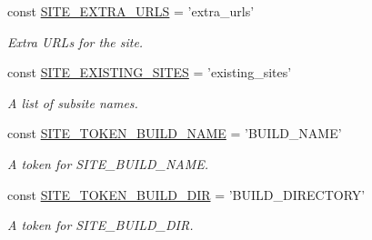 \begin{DoxyCompactItemize}
const \hyperlink{group__site__settings_ga7f80e281910ee7b5584e663f7bb3c27d}{S\-I\-T\-E\-\_\-\-E\-X\-T\-R\-A\-\_\-\-U\-R\-L\-S} = 'extra\-\_\-urls'
\begin{DoxyCompactList}\small\item\em Extra U\-R\-Ls for the site. \end{DoxyCompactList}\item 
const \hyperlink{group__site__settings_ga2ac1a89adfab61fc94edd6f4df134537}{S\-I\-T\-E\-\_\-\-E\-X\-I\-S\-T\-I\-N\-G\-\_\-\-S\-I\-T\-E\-S} = 'existing\-\_\-sites'
\begin{DoxyCompactList}\small\item\em A list of subsite names. \end{DoxyCompactList}\item 
const \hyperlink{group__site__tokens_gabb5bcf41e36db07144b407ef72f9fa61}{S\-I\-T\-E\-\_\-\-T\-O\-K\-E\-N\-\_\-\-B\-U\-I\-L\-D\-\_\-\-N\-A\-M\-E} = 'B\-U\-I\-L\-D\-\_\-\-N\-A\-M\-E'
\begin{DoxyCompactList}\small\item\em A token for S\-I\-T\-E\-\_\-\-B\-U\-I\-L\-D\-\_\-\-N\-A\-M\-E. \end{DoxyCompactList}\item 
const \hyperlink{group__site__tokens_ga1831bee256793ce98d53c98ae6421682}{S\-I\-T\-E\-\_\-\-T\-O\-K\-E\-N\-\_\-\-B\-U\-I\-L\-D\-\_\-\-D\-I\-R} = 'B\-U\-I\-L\-D\-\_\-\-D\-I\-R\-E\-C\-T\-O\-R\-Y'
\begin{DoxyCompactList}\small\item\em A token for S\-I\-T\-E\-\_\-\-B\-U\-I\-L\-D\-\_\-\-D\-I\-R. \end{DoxyCompactList}\end{DoxyCompactItemize}
